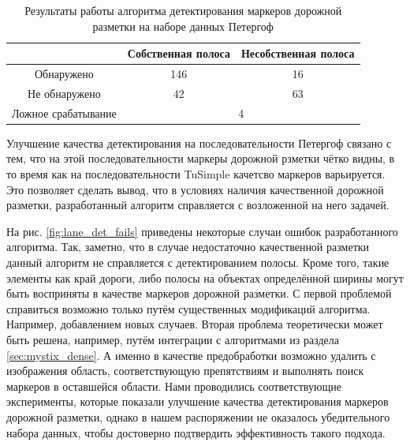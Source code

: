 \documentclass[aps,%
14pt,%
final,%
oneside,
onecolumn,%
musixtex, %
superscriptaddress,%
centertags]{extarticle} %
\begin{document}
\begin{table}
\center
\begin{tabular}{|c|c|c|}
\hline
			& Собственная полоса & Несобственная полоса \\
\hline
	Обнаружено				& 146 & 16\\
\hline
	Не обнаружено			& 42  & 63\\
\hline
	Ложное срабатывание		& \multicolumn{2}{c|}{4}\\
\hline
\end{tabular}
\caption{Результаты работы алгоритма детектирования маркеров дорожной разметки на наборе данных Петергоф}
\label{tab:lanes_peterhof}
\end{table}

Улучшение качества детектирования на последовательности Петергоф связано с тем, что на этой последовательности маркеры дорожной рзметки чётко видны, в то время как на последовательности TuSimple качетсво маркеров варьируется. Это позволяет сделать вывод, что в условиях наличия качественной дорожной разметки, разработанный алгоритм справляется с возложенной на него задачей. 

На рис. \ref{fig:lane_det_fails} приведены некоторые случаи ошибок разработанного алгоритма. Так, заметно, что в случае недостаточно качественной разметки данный алгоритм не справляется с детектированием полосы. Кроме того, такие элементы как край дороги, либо полосы на объектах определённой ширины могут быть восприняты в качестве маркеров дорожной разметки. С первой проблемой справиться возможно только путём существенных модификаций алгоритма. Например, добавлением новых случаев. Вторая проблема теоретически может быть решена, например, путём интеграции с алгоритмами из раздела \ref{sec:mystix_dense}. А именно в качестве предобработки возможно удалить с изображения область, соответствующую препятствиям и выполнять поиск маркеров в оставшейся области. Нами проводились соответствующие эксперименты, которые показали улучшение качества детектирования маркеров дорожной разметки, однако в нашем распоряжении не оказалось убедительного набора данных, чтобы достоверно подтвердить эффективность такого подхода.
\end{document}
